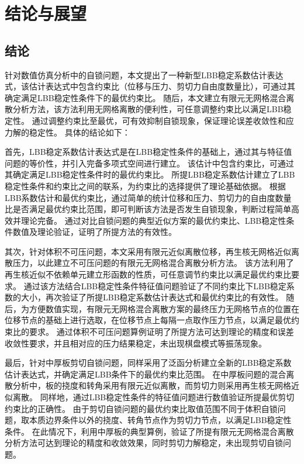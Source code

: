 \chapter{结论与展望}
\section{结论}
针对数值仿真分析中的自锁问题，本文提出了一种新型LBB稳定系数估计表达式，该估计表达式中包含约束比（位移与压力、剪切力自由度数量比），可通过其确定满足LBB稳定性条件下的最优约束比。
随后，本文建立有限元无网格混合离散分析方法，该方法利用无网格离散的便利性，可任意调整约束比以满足LBB稳定性。
通过调整约束比至最优，可有效抑制自锁现象，保证理论误差收敛性和应力解的稳定性。
具体的结论如下：

首先，LBB稳定系数估计表达式是在LBB稳定性条件的基础上，通过其与特征值问题的等价性，并引入完备多项式空间进行建立。
该估计中包含约束比，可通过其确定满足LBB稳定性条件时的最优约束比。
所提LBB稳定系数估计建立了LBB稳定性条件和约束比之间的联系，为约束比的选择提供了理论基础依据。
根据LBB系数估计和最优约束比，通过简单的统计位移和压力、剪切力的自由度数量比是否满足最优约束比范围，即可判断该方法是否发生自锁现象，判断过程简单高效并理论完备。
通过对比自锁问题的典型近似方案的最优约束比、LBB稳定性条件数值及理论验证，证明了所提方法的有效性。

其次，针对体积不可压问题，本文采用有限元近似离散位移，再生核无网格近似离散压力，以此建立不可压问题的有限元无网格混合离散分析方法。
该方法利用了再生核近似不依赖单元建立形函数的性质，可任意调节约束比以满足最优约束比要求。
通过该方法结合LBB稳定性条件特征值问题验证了不同约束比下LBB稳定系数的大小，再次验证了所提LBB稳定系数估计表达式和最优约束比的有效性。
随后，为方便数值实现，有限元无网格混合离散方案的最终压力无网格节点的位置在位移节点的基础上进行选取，在位移节点上每隔一点取作压力节点，以满足最优约束比的要求。
通过体积不可压问题算例证明了所提方法可达到理论的精度和误差收敛性要求，并且相对应的压力结果稳定，未出现棋盘模式等振荡现象。

最后，针对中厚板剪切自锁问题，同样采用了泛函分析建立全新的LBB稳定系数估计表达式，并确定满足LBB条件下的最优约束比范围。
在中厚板问题的混合离散分析中，板的挠度和转角采用有限元近似离散，而剪切力则采用再生核无网格近似离散。
同样地，通过LBB稳定性条件的特征值问题进行数值验证所提最优剪切约束比的正确性。
由于剪切自锁问题的最优约束比取值范围不同于体积自锁问题，取本质边界条件以外的挠度、转角节点作为剪切力节点，以满足LBB稳定性条件。
在此情况下，利用中厚板的典型算例，验证了所提有限元无网格混合离散分析方法可达到理论的精度和收敛效果，同时剪切力解稳定，未出现剪切自锁问题。


